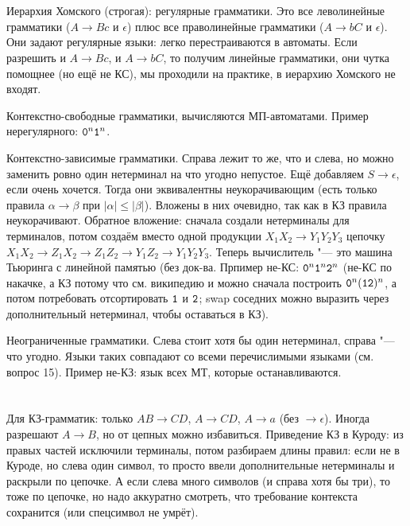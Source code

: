 \section{} %
	Иерархия Хомского (строгая): регулярные грамматики.
	Это все леволинейные грамматики ($A \to Bc$ и $\epsilon$) плюс все праволинейные грамматики ($A \to bC$ и $\epsilon$).
	Они задают регулярные языки: легко перестраиваются в автоматы.
	Если разрешить и $A \to Bc$, и $A \to bC$, то получим линейные грамматики, они чутка помощнее (но ещё не КС),
	мы проходили на практике, в иерархию Хомского не входят.

	Контекстно-свободные грамматики, вычисляются МП-автоматами.
	Пример нерегулярного: $\t{0}^n\t{1}^n$.

	Контекстно-зависимые грамматики.
	Справа лежит то же, что и слева, но можно заменить ровно один нетерминал на что угодно непустое.
	Ещё добавляем $S\to\epsilon$, если очень хочется.
	Тогда они эквивалентны неукорачивающим (есть только правила $\alpha\to\beta$ при $|\alpha|\le|\beta|$).
	Вложены в них очевидно, так как в КЗ правила неукорачивают.
	Обратное вложение: сначала создали нетерминалы для терминалов, потом создаём вместо 
	одной продукции $X_1X_2\to Y_1Y_2Y_3$ цепочку $X_1X_2 \to Z_1X_2 \to Z_1Z_2 \to Y_1Z_2 \to Y_1Y_2Y_3$.
	Теперь вычислитель "--- это машина Тьюринга с линейной памятью (без док-ва.
	Прпимер не-КС: $\t{0}^n\t{1}^n\t{2}^n$ (не-КС по накачке, а КЗ потому что см. википедию и можно
	сначала построить $\t{0}^n(\t{1}\t{2})^n$, а потом потребовать отсортировать $\t{1}$ и $\t{2}$;
	swap соседних можно выразить через дополнительный нетерминал, чтобы оставаться в КЗ).

	Неограниченные грамматики.
	Слева стоит хотя бы один нетерминал, справа "--- что угодно.
	Языки таких совпадают со всеми перечислимыми языками (см. вопрос 15).
	Пример не-КЗ: язык всех МТ, которые останавливаются.

\section{} %
	Для КЗ-грамматик: только $AB\to CD$, $A\to CD$, $A \to a$ (без $\to \epsilon$).
	Иногда разрешают $A \to B$, но от цепных можно избавиться.
	Приведение КЗ в Куроду: из правых частей исключили терминалы, потом разбираем длины
	правил: если не в Куроде, но слева один символ, то просто ввели дополнительные нетерминалы и раскрыли по цепочке.
	А если слева много символов (и справа хотя бы три), то тоже по цепочке, но надо аккуратно смотреть, что требование контекста сохранится
	(или спецсимвол не умрёт).

